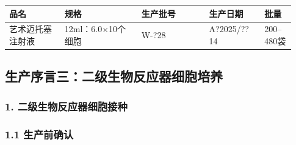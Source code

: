 \documentclass[UTF8,10pt,a4paper,fontset=fandol]{ctexart}
\newcommand{\fieldvalue}[1]{#1}
\newcommand{\handwritten}[1]{#1}
\begin{document}
\begin{tabular}{|p{0.18\linewidth}|p{0.25\linewidth}|p{0.22\linewidth}|p{0.18\linewidth}|p{0.10\linewidth}|}
\hline
品名 & 规格 & 生产批号 & 生产日期 & 批量 \\
\hline
艺术迈托塞注射液 &
12ml：6.0$\times$10个细胞 &
\fieldvalue{\handwritten{W-?28}} &
\fieldvalue{\handwritten{A?2025/??14}} &
200--480袋 \\
\hline
\end{tabular}

\subsection*{生产序言三：二级生物反应器细胞培养}

\subsubsection*{1. 二级生物反应器细胞接种}

\subsubsection*{1.1 生产前确认}
\end{document}
